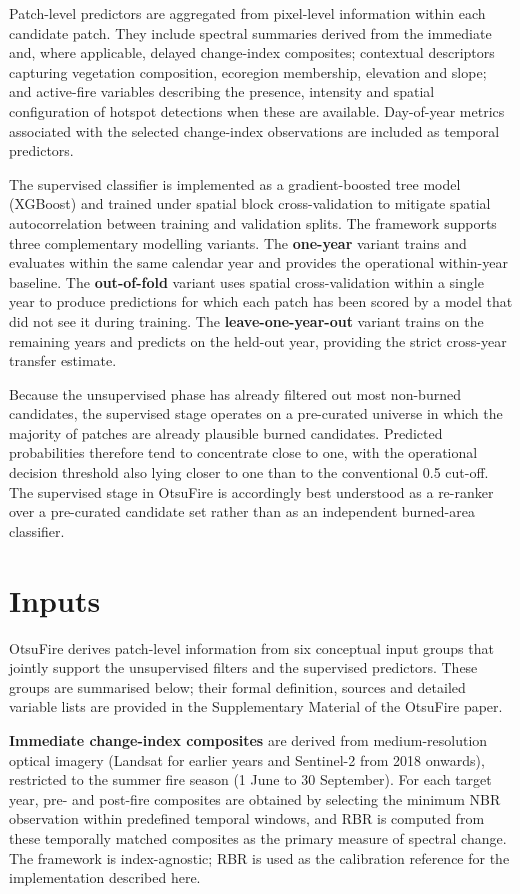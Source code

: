 \documentclass[
  british,
  a4paper,
]{scrbook}
\begin{document}
Patch-level predictors are aggregated from pixel-level information
within each candidate patch. They include spectral summaries derived
from the immediate and, where applicable, delayed change-index
composites; contextual descriptors capturing vegetation composition,
ecoregion membership, elevation and slope; and active-fire variables
describing the presence, intensity and spatial configuration of hotspot
detections when these are available. Day-of-year metrics associated with
the selected change-index observations are included as temporal
predictors.

The supervised classifier is implemented as a gradient-boosted tree
model (XGBoost) and trained under spatial block cross-validation to
mitigate spatial autocorrelation between training and validation splits.
The framework supports three complementary modelling variants. The
\textbf{one-year} variant trains and evaluates within the same calendar
year and provides the operational within-year baseline. The
\textbf{out-of-fold} variant uses spatial cross-validation within a
single year to produce predictions for which each patch has been scored
by a model that did not see it during training. The
\textbf{leave-one-year-out} variant trains on the remaining years and
predicts on the held-out year, providing the strict cross-year transfer
estimate.

Because the unsupervised phase has already filtered out most non-burned
candidates, the supervised stage operates on a pre-curated universe in
which the majority of patches are already plausible burned candidates.
Predicted probabilities therefore tend to concentrate close to one, with
the operational decision threshold also lying closer to one than to the
conventional 0.5 cut-off. The supervised stage in OtsuFire is
accordingly best understood as a re-ranker over a pre-curated candidate
set rather than as an independent burned-area classifier.

\section{Inputs}\label{inputs}

OtsuFire derives patch-level information from six conceptual input
groups that jointly support the unsupervised filters and the supervised
predictors. These groups are summarised below; their formal definition,
sources and detailed variable lists are provided in the Supplementary
Material of the OtsuFire paper.

\textbf{Immediate change-index composites} are derived from
medium-resolution optical imagery (Landsat for earlier years and
Sentinel-2 from 2018 onwards), restricted to the summer fire season (1
June to 30 September). For each target year, pre- and post-fire
composites are obtained by selecting the minimum NBR observation within
predefined temporal windows, and RBR is computed from these temporally
matched composites as the primary measure of spectral change. The
framework is index-agnostic; RBR is used as the calibration reference
for the implementation described here.
\end{document}
